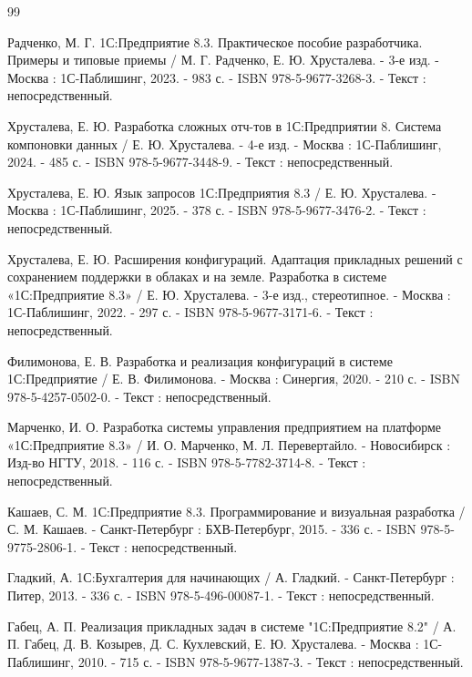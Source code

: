
\begin{thebibliography}{99}
	
	
	 Радченко, М. Г. 1С:Предприятие 8.3. Практическое пособие разработчика. Примеры и типовые приемы / М. Г. Радченко, Е. Ю. Хрусталева. - 3-е изд. - Москва : 1С-Паблишинг, 2023. - 983 с. - ISBN 978-5-9677-3268-3. - Текст : непосредственный.
	
	 Хрусталева, Е. Ю. Разработка сложных отч-тов в 1С:Предприятии 8. Система компоновки данных / Е. Ю. Хрусталева. - 4-е изд. - Москва : 1С-Паблишинг, 2024. - 485 с. - ISBN 978-5-9677-3448-9. - Текст : непосредственный.
	
	 Хрусталева, Е. Ю. Язык запросов 1С:Предприятия 8.3 / Е. Ю. Хрусталева. - Москва : 1С-Паблишинг, 2025. - 378 с. - ISBN 978-5-9677-3476-2. - Текст : непосредственный.
	
	 Хрусталева, Е. Ю. Расширения конфигураций. Адаптация прикладных решений с сохранением поддержки в облаках и на земле. Разработка в системе «1С:Предприятие 8.3» / Е. Ю. Хрусталева. - 3-е изд., стереотипное. - Москва : 1С-Паблишинг, 2022. - 297 с. - ISBN 978-5-9677-3171-6. - Текст : непосредственный.
	
	 Филимонова, Е. В. Разработка и реализация конфигураций в системе 1С:Предприятие / Е. В. Филимонова. - Москва : Синергия, 2020. - 210 с. - ISBN 978-5-4257-0502-0. - Текст : непосредственный.
	
	 Марченко, И. О. Разработка системы управления предприятием на платформе «1С:Предприятие 8.3» / И. О. Марченко, М. Л. Перевертайло. - Новосибирск : Изд-во НГТУ, 2018. - 116 с. - ISBN 978-5-7782-3714-8. - Текст : непосредственный.
	
	 Кашаев, С. М. 1С:Предприятие 8.3. Программирование и визуальная разработка / С. М. Кашаев. - Санкт-Петербург : БХВ-Петербург, 2015. - 336 с. - ISBN 978-5-9775-2806-1. - Текст : непосредственный.
	
	 Гладкий, А. 1С:Бухгалтерия для начинающих / А. Гладкий. - Санкт-Петербург : Питер, 2013. - 336 с. - ISBN 978-5-496-00087-1. - Текст : непосредственный.
	
	 Габец, А. П. Реализация прикладных задач в системе "1С:Предприятие 8.2" / А. П. Габец, Д. В. Козырев, Д. С. Кухлевский, Е. Ю. Хрусталева. - Москва : 1С-Паблишинг, 2010. - 715 с. - ISBN 978-5-9677-1387-3. - Текст : непосредственный.
	

\end{thebibliography}
